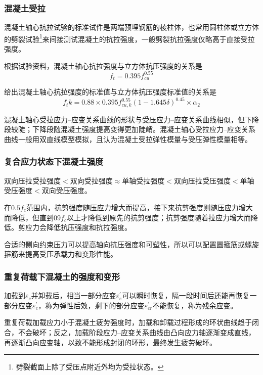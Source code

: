 \documentclass{article}
\begin{document}
\subsubsection{混凝土受拉}
\par 混凝土轴心抗拉试验的标准试件是两端预埋钢筋的棱柱体，也常用圆柱体或立方体的劈裂试验\footnote{劈裂截面上除了受压点附近外均为受拉状态。}来间接测试混凝土的抗拉强度，一般劈裂抗拉强度仅略高于直接受拉强度。
\par 根据试验资料，混凝土轴心抗拉强度与立方体抗压强度的关系是
$$
      f_t = 0.395 f_{cu}^{0.55}
$$
\par \gb{}给出混凝土轴心抗拉强度的标准值与立方体抗压强度标准值的关系是
$$
      f_tk = 0.88 \times 0.395 f_{cu,k}^{0.55} (1-1.645\delta)^{0.45}\times \alpha_2
$$
\par 混凝土轴心受拉应力--应变关系曲线的形状与受压应力--应变关系曲线相似，但下降段较陡；下降段随混凝土强度提高变得更加陡峭。混凝土轴心受拉应力--应变关系曲线一般用双直线模型模拟，且认为混凝土受拉弹性模量与受压弹性模量相等。
\subsubsection{复合应力状态下混凝土强度}
\par 双向压拉受拉强度$<$双向受拉强度$\approx$单轴受拉强度$<$双向压拉受压强度$<$单轴受压强度$<$双向受压强度。
\par 在$0.5f_c$范围内，抗剪强度随压应力增大而提高，接下来抗剪强度则随压应力增大而降低，但直到$09f_c$以上才降低到原先的抗剪强度；抗剪强度随着拉应力增大而降低。剪应力会降低抗压强度和抗拉强度。
\par 合适的侧向约束压力可以提高轴向抗压强度和可塑性，所以可以配置圆箍筋或螺旋箍筋来提高受压承载力和变形性能。
\subsubsection{重复荷载下混凝土的强度和变形}
\par 加载到$\varepsilon_c$并卸载后，相当一部分应变$\varepsilon_e^{\prime}$可以瞬时恢复，隔一段时间后还能再恢复一部分应变$\varepsilon_c^{\prime}$，称为弹性后效，剩下的部分应变$\varepsilon_{cr}^{\prime}$不能恢复，称为残余应变。
\par 重复荷载加载应力小于混凝土疲劳强度时，加载和卸载过程形成的环状曲线趋于闭合，不会破坏；反之，加载阶段应力--应变关系曲线由凸向应力轴逐渐变成直线，再逐渐凸向应变轴，以致不能形成封闭的环形，最终发生疲劳破坏。
\end{document}
